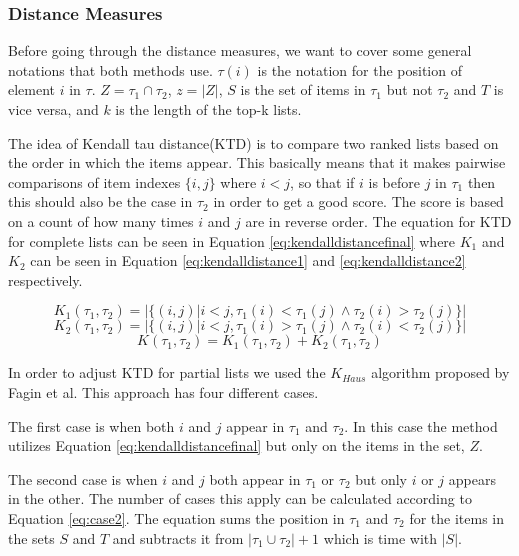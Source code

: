 \subsubsection{Distance Measures}\label{sec:distance}
Before going through the distance measures, we want to cover some general notations that both methods use. $\tau(i)$ is the notation for the position of element $i$ in $\tau$. $Z = \tau_1 \cap \tau_2$, $z=|Z|$, $S$ is the set of items in $\tau_1$ but not $\tau_2$ and $T$ is vice versa, and $k$ is the length of the top-k lists.

The idea of Kendall tau distance(KTD) is to compare two ranked lists based on the order in which the items appear. This basically means that it makes pairwise comparisons of item indexes $\{i,j\}$ where $i < j$, so that if $i$ is before $j$ in $\tau_1$ then this should also be the case in $\tau_2$ in order to get a good score. The score is based on a count of how many times $i$ and $j$ are in reverse order. The equation for KTD for complete lists can be seen in Equation \ref{eq:kendalldistancefinal} where $K_1$ and $K_2$ can be seen in Equation \ref{eq:kendalldistance1} and \ref{eq:kendalldistance2} respectively.

\begin{equation}\label{eq:kendalldistance1}
K_1(\tau_1,\tau_2) = | \{(i,j) | i < j, \tau_1 (i) < \tau_1 (j) \land \tau_2 (i) > \tau_2 (j)\}|
\end{equation}
\begin{equation}\label{eq:kendalldistance2}
K_2(\tau_1,\tau_2) = | \{(i,j) | i < j, \tau_1 (i) > \tau_1 (j) \land \tau_2 (i) < \tau_2 (j) \} |
\end{equation}
\begin{equation}\label{eq:kendalldistancefinal}
K(\tau_1,\tau_2) = K_1(\tau_1,\tau_2) + K_2(\tau_1,\tau_2)
\end{equation}

In order to adjust KTD for partial lists we used the $K_{Haus}$ algorithm proposed by Fagin et al\cite{comparing:topk}. This approach has four different cases.

The first case is when both $i$ and $j$ appear in $\tau_1$ and $\tau_2$. In this case the method utilizes Equation \ref{eq:kendalldistancefinal} but only on the items in the set, $Z$.

The second case is when $i$ and $j$ both appear in $\tau_1$ or $\tau_2$ but only $i$ or $j$ appears in the other. The number of cases this apply can be calculated according to Equation \ref{eq:case2}. The equation sums the position in $\tau_1$ and $\tau_2$ for the items in the sets $S$ and $T$ and subtracts it from $|\tau_1 \cup \tau_2| + 1$ which is time with $|S|$.

